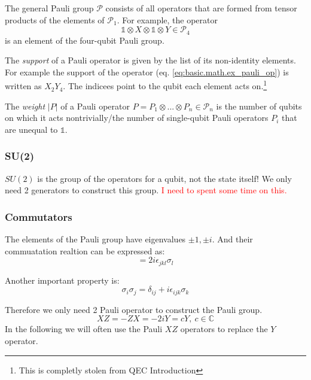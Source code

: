 The general Pauli group $\mathcal{P}$ consists of all operators that are formed from tensor products of the elements of $\mathcal{P}_1$. 
For example, the operator
\begin{equation}
    \mathds{1} \otimes X \otimes \mathds{1} \otimes Y \in \mathcal{P}_4
    \label{eq:basic.math.ex_pauli_op}
\end{equation}
is an element of the four-qubit Pauli group. 

The \textit{support} of a Pauli operator is given by the list of its non-identity elements.
For example the support of the operator (eq. \ref{eq:basic.math.ex_pauli_op}) is written as $X_2Y_4$.
The indicees point to the qubit each element acts on.\footnote{This is completly stolen from QEC Introduction} \cite{QECintro}

The \textit{weight} $|P|$ of a Pauli operator $P=P_1 \otimes... \otimes P_n \in \mathcal{P}_n $ is 
the number of qubits on which it acts nontrivially/the number of single-qubit Pauli operators 
$P_i$ that are unequal to $\mathds{1}$. \cite{QECmemory}

\subsubsection{SU(2)}
$SU(2)$ is the group of the operators for a qubit, not the state itself!
We only need 2 generators to construct this group.
\textcolor{red}{I need to spent some time on this.}


\subsubsection{Commutators}
The elements of the Pauli group have eigenvalues ${\pm 1,\pm i}$.
And their commuatation realtion can be expressed as:
\begin{equation}
    [\sigma_j,\sigma_k] = 2 i \epsilon_{jkl} \sigma_l
\end{equation}

Another important property is:
\begin{equation}
    \sigma_i \sigma_j = \delta_{ij} + i \epsilon_{ijk} \sigma_k
\end{equation}

Therefore we only need 2 Pauli operator to construct the Pauli group.
\begin{equation}
    X Z = - Z X = -2 i Y = c Y, \ c \in \mathbb{C}
\end{equation}
In the following we will often use the Pauli $XZ$ operators to replace the $Y$ operator.

